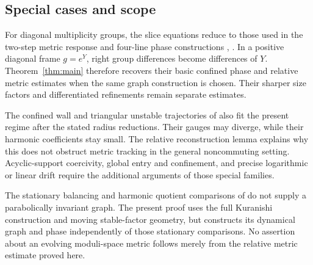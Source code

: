 \subsection{Special cases and scope}
For diagonal multiplicity groups, the slice equations
reduce to those used in the two-step metric response
and four-line phase constructions
\cite[Section~6]{wuebben3},
\cite[Sections~3--5]{wuebben8}.
In a positive diagonal frame $g=e^Y$, right group
differences become differences of $Y$.
Theorem~\ref{thm:main} therefore recovers their basic
confined phase and relative metric estimates when
the same graph construction is chosen. Their sharper
size factors and differentiated refinements remain
separate estimates.

The confined wall and triangular unstable trajectories
of \cite[Sections~3--5]{wuebben9} also fit the present
regime after the stated radius reductions. Their
gauges may diverge, while their harmonic coefficients
stay small. The relative reconstruction lemma explains
why this does not obstruct metric tracking in the
general noncommuting setting. Acyclic-support coercivity,
global entry and confinement, and precise logarithmic
or linear drift require the additional arguments of
those special families.

The stationary balancing and harmonic quotient comparisons
of \cite{wuebben14,wuebben15} do not supply a parabolically
invariant graph. The present proof uses the full Kuranishi
construction and moving stable-factor geometry, but
constructs its dynamical graph and phase independently
of those stationary comparisons. No assertion about
an evolving moduli-space metric follows merely from
the relative metric estimate proved here.
